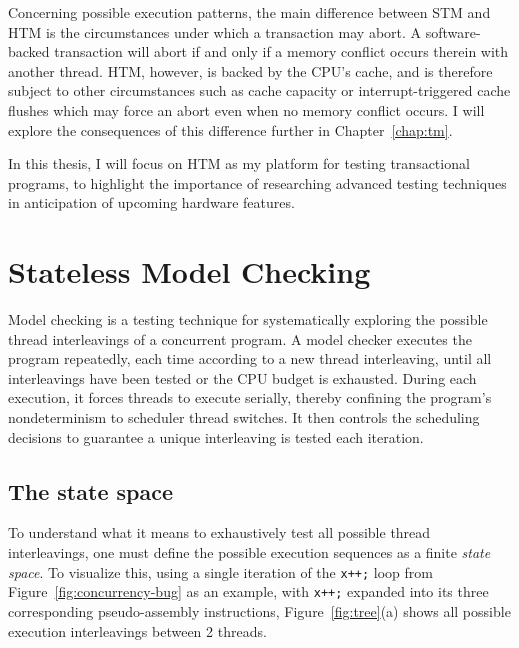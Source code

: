 Concerning possible execution patterns,
the main difference between STM and HTM is the circumstances under which a transaction may abort.
A software-backed transaction will abort if and only if a memory conflict occurs therein with another thread.
HTM, however, is backed by the CPU's cache, and is therefore subject to other circumstances such as cache capacity or interrupt-triggered cache flushes which may force an abort even when no memory conflict occurs.
I will explore the consequences of this difference further in Chapter~\ref{chap:tm}.

In this thesis, I will focus on HTM as my platform for testing transactional programs,
to highlight the importance of researching advanced testing techniques in anticipation of upcoming hardware features.


\section{Stateless Model Checking}

Model checking \cite{verisoft} is a testing technique for systematically exploring the possible thread interleavings of a concurrent program.
A model checker executes the program repeatedly, each time according to a new thread interleaving, until all interleavings have been tested or the CPU budget is exhausted.
During each execution, it forces threads to execute serially, thereby confining the program's nondeterminism to scheduler thread switches.
It then controls the scheduling decisions
to guarantee a unique interleaving is tested each iteration.

\subsection{The state space}

To understand what it means to exhaustively test all possible thread interleavings,
one must define the possible execution sequences as a finite {\em state space}.
To visualize this,
using a single iteration of the {\tt x++;} loop from Figure~\ref{fig:concurrency-bug} as an example,
with {\tt x++;} expanded into its three corresponding pseudo-assembly instructions,
Figure~\ref{fig:tree}(a) shows all possible execution interleavings
between 2 threads.


